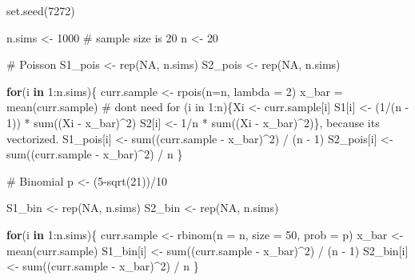 \documentclass[
]{article}
\newenvironment{Shaded}{\begin{snugshade}}{\end{snugshade}}
\newcommand{\AttributeTok}[1]{\textcolor[rgb]{0.40,0.45,0.13}{#1}}
\newcommand{\CommentTok}[1]{\textcolor[rgb]{0.37,0.37,0.37}{#1}}
\newcommand{\ConstantTok}[1]{\textcolor[rgb]{0.56,0.35,0.01}{#1}}
\newcommand{\ControlFlowTok}[1]{\textcolor[rgb]{0.00,0.23,0.31}{\textbf{#1}}}
\newcommand{\DecValTok}[1]{\textcolor[rgb]{0.68,0.00,0.00}{#1}}
\newcommand{\FunctionTok}[1]{\textcolor[rgb]{0.28,0.35,0.67}{#1}}
\newcommand{\NormalTok}[1]{\textcolor[rgb]{0.00,0.23,0.31}{#1}}
\newcommand{\OtherTok}[1]{\textcolor[rgb]{0.00,0.23,0.31}{#1}}
\newcommand{\SpecialCharTok}[1]{\textcolor[rgb]{0.37,0.37,0.37}{#1}}
\begin{document}
\begin{Shaded}
\begin{Highlighting}[numbers=left,,]
\FunctionTok{set.seed}\NormalTok{(}\DecValTok{7272}\NormalTok{)}

\NormalTok{n.sims }\OtherTok{\textless{}{-}} \DecValTok{1000}
\CommentTok{\# sample size is 20}
\NormalTok{n }\OtherTok{\textless{}{-}} \DecValTok{20}

\CommentTok{\# Poisson}
\NormalTok{S1\_pois }\OtherTok{\textless{}{-}} \FunctionTok{rep}\NormalTok{(}\ConstantTok{NA}\NormalTok{, n.sims)}
\NormalTok{S2\_pois }\OtherTok{\textless{}{-}} \FunctionTok{rep}\NormalTok{(}\ConstantTok{NA}\NormalTok{, n.sims)}

\ControlFlowTok{for}\NormalTok{(i }\ControlFlowTok{in} \DecValTok{1}\SpecialCharTok{:}\NormalTok{n.sims)\{}
\NormalTok{  curr.sample }\OtherTok{\textless{}{-}} \FunctionTok{rpois}\NormalTok{(}\AttributeTok{n=}\NormalTok{n, }\AttributeTok{lambda =} \DecValTok{2}\NormalTok{)}
\NormalTok{  x\_bar }\OtherTok{=} \FunctionTok{mean}\NormalTok{(curr.sample)}
  \CommentTok{\# don\textquotesingle{}t need for (i in 1:n)\{Xi \textless{}{-} curr.sample[i] S1[i] \textless{}{-} (1/(n {-} 1)) * sum((Xi {-} x\_bar)\^{}2) S2[i] \textless{}{-} 1/n * sum((Xi {-} x\_bar)\^{}2)\}, because it\textquotesingle{}s vectorized.}
\NormalTok{  S1\_pois[i] }\OtherTok{\textless{}{-}} \FunctionTok{sum}\NormalTok{((curr.sample }\SpecialCharTok{{-}}\NormalTok{ x\_bar)}\SpecialCharTok{\^{}}\DecValTok{2}\NormalTok{) }\SpecialCharTok{/}\NormalTok{ (n }\SpecialCharTok{{-}} \DecValTok{1}\NormalTok{)}
\NormalTok{  S2\_pois[i] }\OtherTok{\textless{}{-}} \FunctionTok{sum}\NormalTok{((curr.sample }\SpecialCharTok{{-}}\NormalTok{ x\_bar)}\SpecialCharTok{\^{}}\DecValTok{2}\NormalTok{) }\SpecialCharTok{/}\NormalTok{ n}
\NormalTok{  \}}

\CommentTok{\# Binomial}
\NormalTok{p }\OtherTok{\textless{}{-}}\NormalTok{ (}\DecValTok{5}\SpecialCharTok{{-}}\FunctionTok{sqrt}\NormalTok{(}\DecValTok{21}\NormalTok{))}\SpecialCharTok{/}\DecValTok{10}

\NormalTok{S1\_bin }\OtherTok{\textless{}{-}} \FunctionTok{rep}\NormalTok{(}\ConstantTok{NA}\NormalTok{, n.sims)}
\NormalTok{S2\_bin }\OtherTok{\textless{}{-}} \FunctionTok{rep}\NormalTok{(}\ConstantTok{NA}\NormalTok{, n.sims)}

\ControlFlowTok{for}\NormalTok{(i }\ControlFlowTok{in} \DecValTok{1}\SpecialCharTok{:}\NormalTok{n.sims)\{}
\NormalTok{  curr.sample }\OtherTok{\textless{}{-}} \FunctionTok{rbinom}\NormalTok{(}\AttributeTok{n =}\NormalTok{ n, }\AttributeTok{size =} \DecValTok{50}\NormalTok{, }\AttributeTok{prob =}\NormalTok{ p)}
\NormalTok{  x\_bar }\OtherTok{\textless{}{-}} \FunctionTok{mean}\NormalTok{(curr.sample)}
\NormalTok{  S1\_bin[i] }\OtherTok{\textless{}{-}} \FunctionTok{sum}\NormalTok{((curr.sample }\SpecialCharTok{{-}}\NormalTok{ x\_bar)}\SpecialCharTok{\^{}}\DecValTok{2}\NormalTok{) }\SpecialCharTok{/}\NormalTok{ (n }\SpecialCharTok{{-}} \DecValTok{1}\NormalTok{)}
\NormalTok{  S2\_bin[i] }\OtherTok{\textless{}{-}} \FunctionTok{sum}\NormalTok{((curr.sample }\SpecialCharTok{{-}}\NormalTok{ x\_bar)}\SpecialCharTok{\^{}}\DecValTok{2}\NormalTok{) }\SpecialCharTok{/}\NormalTok{ n}
\NormalTok{\}}


\end{Highlighting}
\end{Shaded}
\end{document}
